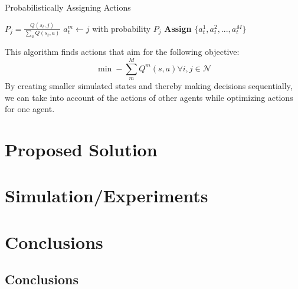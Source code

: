 \documentclass[letterpaper, 10 pt, conference]{ieeeconf}  %
\begin{document}
\begin{algorithm}[H]
\caption{Probabilistically Assigning Actions}
\begin{algorithmic}
            \State $P_j = \frac{Q(s_t,j)}{\sum_a Q(s_t,a)}$
            \State $a_t^m \leftarrow j$ with probability $P_j$
        \EndIf
    \EndFor
    \State\textbf{Assign} $\{a^1_t,a^2_t,...,a^M_t\}$
\EndFor
\end{algorithmic}
\end{algorithm}

This algorithm finds actions that aim for the following objective: 
\begin{equation}
        \min -\sum_m^M Q^m(s,a)\forall i,j\in \mathcal{N}
\end{equation}
By creating smaller simulated states and thereby making decisions sequentially, we can take into account of the actions of other agents while optimizing actions for one agent.  

\section{Proposed Solution}

\section{Simulation/Experiments}

\addtolength{\textheight}{-3cm}   %

\section{Conclusions}

\subsection{Conclusions}
\end{document}
